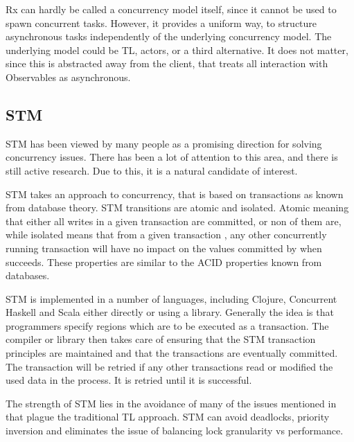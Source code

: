 \ac{Rx} can hardly be called a concurrency model itself, since it cannot be used to spawn concurrent tasks. However, it provides a uniform way, to structure asynchronous tasks independently of the underlying concurrency model. The underlying model could be \ac{TL}, actors, or a third alternative. It does not matter, since this is abstracted away from the client, that treats all interaction with Observables as asynchronous.

\subsection{\acl{STM}}
\ac{STM} has been viewed by many people as a promising direction for solving concurrency issues\cite{sutter2005software}. There has been a lot of attention to this area, and there is still active research. Due to this, it is a natural candidate of interest.

\ac{STM} takes an approach to concurrency, that is based on transactions as known from database theory\cite[p. 1]{shavit1997software}. \ac{STM} transitions are atomic and isolated. Atomic meaning that either all writes in a given transaction are committed, or non of them are, while isolated means that from a given transaction , any other concurrently running transaction will have no impact on the values committed by  when  succeeds\cite[p. 102]{sevenModels}. These properties are similar to the \ac{ACID} properties known from databases\cite[p. 754]{elmasri2011fundamentals}.

\ac{STM} is implemented in a number of languages, including Clojure\cite[p. 101]{sevenModels}, Concurrent Haskell\cite{harris2005composable} and Scala\cite{goodman2011muts} either directly or using a library. Generally the idea is that programmers specify regions which are to be executed as a transaction. The compiler or library then takes care of ensuring that the \ac{STM} transaction principles are maintained and that the transactions are eventually committed\cite[p. 1]{saha2006mcrt}. The transaction will be retried if any other transactions read or modified the used data in the process. It is retried until it is successful.

The strength of \ac{STM} lies in the avoidance of many of the issues mentioned in  that plague the traditional \ac{TL} approach. \ac{STM} can avoid deadlocks, priority inversion and eliminates the issue of balancing lock granularity vs performance\cite[p. 1]{harris2005composable}.

